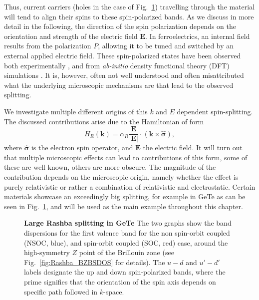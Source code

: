 Thus, current carriers (holes in the case of Fig.~\ref{fig:Rashba_intro_dispersion}) travelling through the material will tend to align their spins to these spin-polarized bands.
As we discuss in more detail in the following, the direction of the spin polarization depends on the orientation and strength of the electric field $\mathbf{E}$. In ferroelectrics, an internal field results from the polarization $P$, allowing it to be tuned and switched by an external applied electric field. These spin-polarized states have been observed both experimentally \cite{Ishizaka2011,Liebmann2016,Krempasky2015SurfaceSemiconductor}, and from {\it ab-initio} density functional theory (DFT) simulations \cite{DiSante2013}. It is, however, often not well understood and often misattributed what the underlying microscopic mechanisms are that lead to the observed splitting.

We investigate multiple different origins of this $k$ and $E$ dependent spin-splitting. The discussed contributions arise due to the Hamiltonian of form
\begin{equation}
	\label{eq:Rashba_form}
	H_R(\mathbf{k}) = \alpha_R \frac{\mathbf{E}}{|\mathbf{E}|} \cdot (\mathbf{k} \times \hat{\mathbf{\sigma}}),
\end{equation}
where $\hat{\mathbf{\sigma}}$ is the electron spin operator, and $\mathbf{E}$ the electric field. It will turn out that multiple microscopic effects can lead to contributions of this form, some of these are well known, others are more obscure. The magnitude of the contribution depends on the microscopic origin, namely whether the effect is purely relativistic or rather a combination of relativistic and electrostatic. Certain materials showcase an exceedingly big splitting, for example in GeTe as can be seen in Fig.~\ref{fig:Rashba_intro_dispersion}, and will be used as the main example throughout this chapter.
\begin{figure}[h]
	\caption{\label{fig:Rashba_intro_dispersion}
		{\bf Large Rashba splitting in GeTe} The two graphs show the band dispersions for the first valence band for the non spin-orbit coupled (NSOC, blue), and spin-orbit coupled (SOC, red) case, around the high-symmetry $Z$ point of the Brillouin zone (see Fig.~\ref{fig:Rashba_BZBSDOS} for details). The $u-d$ and $u'-d'$ labels designate the up and down spin-polarized bands, where the prime signifies that the orientation of the spin axis depends on specific path followed in $k$-space. 
	}
\end{figure}

